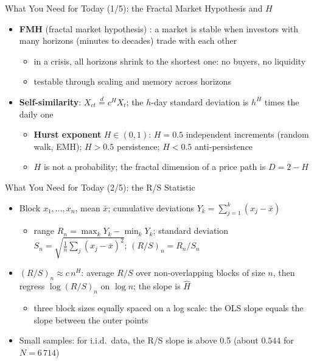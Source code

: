 \begin{frame}{What You Need for Today (1/5): the Fractal Market Hypothesis and $H$}
\itemsize{\small}
\begin{itemize}
    \item \textbf{FMH} (fractal market hypothesis) : a market is stable when investors with many horizons (minutes to decades) trade with each other
    \begin{itemize}
        \item in a crisis, all horizons shrink to the shortest one: no buyers, no liquidity
        \item testable through scaling and memory across horizons
    \end{itemize}
    \item \textbf{Self-similarity}: $X_{ct} \overset{d}{=} c^H X_t$; the $h$-day standard deviation is $h^H$ times the daily one
    \begin{itemize}
        \item \textbf{Hurst exponent} $H \in (0, 1)$: $H = 0.5$ independent increments (random walk, EMH); $H > 0.5$ persistence; $H < 0.5$ anti-persistence
        \item $H$ is not a probability; the fractal dimension of a price path is $D = 2 - H$
    \end{itemize}
\end{itemize}
\end{frame}

\begin{frame}{What You Need for Today (2/5): the R/S Statistic}
\itemsize{\small}
\begin{itemize}
    \item Block $x_1, \dots, x_n$, mean $\bar x$; cumulative deviations $Y_k = \sum_{j=1}^{k}(x_j - \bar x)$
    \begin{itemize}
        \item range $R_n = \max_k Y_k - \min_k Y_k$; standard deviation $S_n = \sqrt{\tfrac1n\sum_j(x_j - \bar x)^2}$; $(R/S)_n = R_n/S_n$ 
    \end{itemize}
    \item $(R/S)_n \approx c\,n^H$: average $R/S$ over non-overlapping blocks of size $n$, then regress $\log(R/S)_n$ on $\log n$; the slope is $\hat H$
    \begin{itemize}
        \item three block sizes equally spaced on a log scale: the OLS slope equals the slope between the outer points
    \end{itemize}
    \item Small samples: for i.i.d.\ data, the R/S slope is above 0.5 (about $0.544$ for $N = 6\,714$) 
\end{itemize}
\end{frame}

